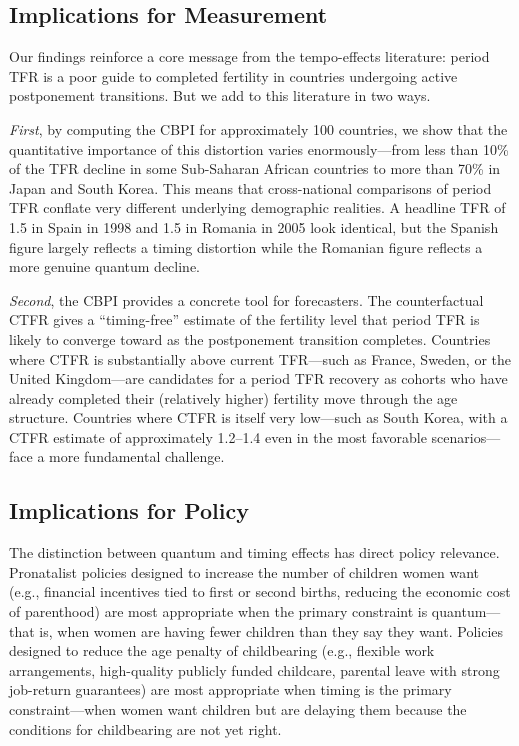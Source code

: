 \documentclass[12pt]{article}
\begin{document}
\subsection{Implications for Measurement}

Our findings reinforce a core message from the tempo-effects
literature: period TFR is a poor guide to completed fertility in
countries undergoing active postponement transitions.  But we add
to this literature in two ways.

\emph{First}, by computing the CBPI for approximately 100 countries,
we show that the quantitative importance of this distortion varies
enormously---from less than 10\% of the TFR decline in some
Sub-Saharan African countries to more than 70\% in Japan and South
Korea.  This means that cross-national comparisons of period TFR
conflate very different underlying demographic realities.  A headline
TFR of 1.5 in Spain in 1998 and 1.5 in Romania in 2005 look
identical, but the Spanish figure largely reflects a timing distortion
while the Romanian figure reflects a more genuine quantum decline.

\emph{Second}, the CBPI provides a concrete tool for forecasters.
The counterfactual CTFR gives a ``timing-free'' estimate of the
fertility level that period TFR is likely to converge toward as the
postponement transition completes.  Countries where CTFR is
substantially above current TFR---such as France, Sweden, or the
United Kingdom---are candidates for a period TFR recovery as cohorts
who have already completed their (relatively higher) fertility move
through the age structure.  Countries where CTFR is itself very low---such
as South Korea, with a CTFR estimate of approximately 1.2--1.4 even
in the most favorable scenarios---face a more fundamental challenge.

\subsection{Implications for Policy}

The distinction between quantum and timing effects has direct policy
relevance.  Pronatalist policies designed to increase the number of
children women want (e.g., financial incentives tied to first or
second births, reducing the economic cost of parenthood) are most
appropriate when the primary constraint is quantum---that is, when women
are having fewer children than they say they want.  Policies designed
to reduce the age penalty of childbearing (e.g., flexible work
arrangements, high-quality publicly funded childcare, parental leave
with strong job-return guarantees) are most appropriate when timing
is the primary constraint---when women want children but are delaying
them because the conditions for childbearing are not yet right.
\end{document}

